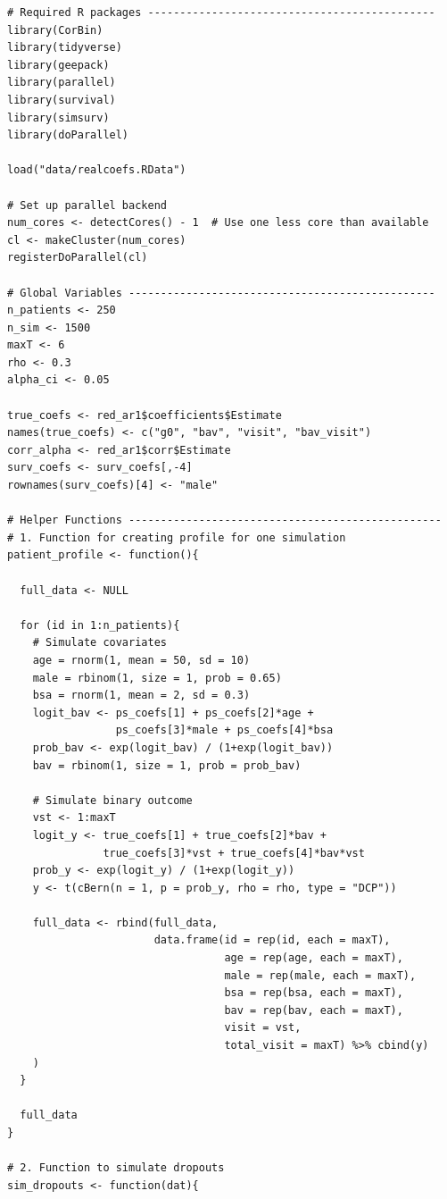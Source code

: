 \documentclass[
]{aft}
\begin{document}
\begin{verbatim}
# Required R packages ---------------------------------------------
library(CorBin)
library(tidyverse)
library(geepack)
library(parallel)
library(survival)
library(simsurv)
library(doParallel)

load("data/realcoefs.RData")

# Set up parallel backend
num_cores <- detectCores() - 1  # Use one less core than available
cl <- makeCluster(num_cores)
registerDoParallel(cl)

# Global Variables ------------------------------------------------
n_patients <- 250 
n_sim <- 1500
maxT <- 6
rho <- 0.3
alpha_ci <- 0.05

true_coefs <- red_ar1$coefficients$Estimate
names(true_coefs) <- c("g0", "bav", "visit", "bav_visit")
corr_alpha <- red_ar1$corr$Estimate
surv_coefs <- surv_coefs[,-4]
rownames(surv_coefs)[4] <- "male"

# Helper Functions -------------------------------------------------
# 1. Function for creating profile for one simulation 
patient_profile <- function(){
  
  full_data <- NULL 
  
  for (id in 1:n_patients){
    # Simulate covariates
    age = rnorm(1, mean = 50, sd = 10)
    male = rbinom(1, size = 1, prob = 0.65)
    bsa = rnorm(1, mean = 2, sd = 0.3)
    logit_bav <- ps_coefs[1] + ps_coefs[2]*age + 
                 ps_coefs[3]*male + ps_coefs[4]*bsa
    prob_bav <- exp(logit_bav) / (1+exp(logit_bav))
    bav = rbinom(1, size = 1, prob = prob_bav)
    
    # Simulate binary outcome 
    vst <- 1:maxT
    logit_y <- true_coefs[1] + true_coefs[2]*bav + 
               true_coefs[3]*vst + true_coefs[4]*bav*vst
    prob_y <- exp(logit_y) / (1+exp(logit_y)) 
    y <- t(cBern(n = 1, p = prob_y, rho = rho, type = "DCP"))
    
    full_data <- rbind(full_data, 
                       data.frame(id = rep(id, each = maxT), 
                                  age = rep(age, each = maxT), 
                                  male = rep(male, each = maxT), 
                                  bsa = rep(bsa, each = maxT), 
                                  bav = rep(bav, each = maxT), 
                                  visit = vst, 
                                  total_visit = maxT) %>% cbind(y)
    )
  }
  
  full_data
}

# 2. Function to simulate dropouts 
sim_dropouts <- function(dat){
  

\end{verbatim}
\end{document}
